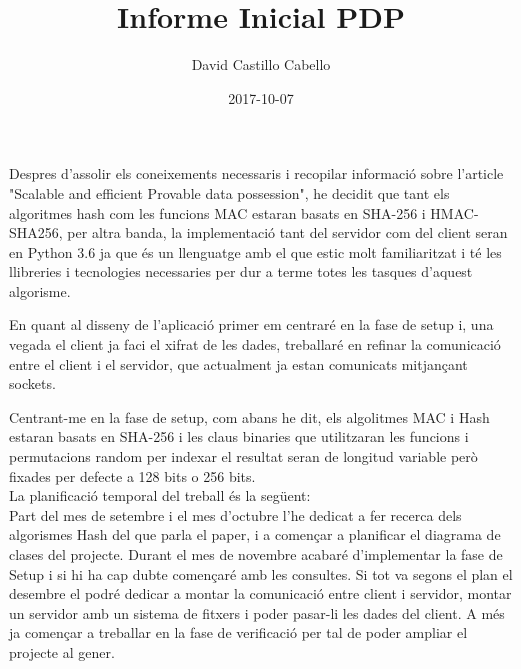 \documentclass{article}
\title{Informe Inicial PDP}
\date{2017-10-07}
\author{David Castillo Cabello}
\begin{document}
	\maketitle
	\newpage
	
Despres d'assolir els coneixements necessaris i recopilar informació sobre l'article "Scalable and efficient Provable data possession", he decidit que tant els algoritmes hash com les funcions MAC estaran basats en SHA-256 i HMAC-SHA256, per altra banda, la implementació tant del servidor com del client seran en Python 3.6 ja que és un llenguatge amb el que estic molt familiaritzat i té les llibreries i tecnologies necessaries per dur a terme totes les tasques d'aquest algorisme.

En quant al disseny de l'aplicació primer em centraré en la fase de setup i, una vegada el client ja faci el xifrat de les dades, treballaré en refinar la comunicació entre el client i el servidor, que actualment ja estan comunicats mitjançant sockets. 

Centrant-me en la fase de setup, com abans he dit, els algolitmes MAC i Hash estaran basats en SHA-256  i les claus binaries que utilitzaran les funcions i permutacions random per indexar el resultat seran de longitud variable però fixades per defecte a 128 bits o 256 bits.\\

La planificació temporal del treball és la següent:\\
Part del mes de setembre i el mes d'octubre l'he dedicat a fer recerca dels algorismes Hash del que parla el paper, i a començar a planificar el diagrama de clases del projecte. 
Durant el mes de novembre acabaré d'implementar la fase de Setup i si hi ha cap dubte començaré amb les consultes. 
Si tot va segons el plan el desembre el podré dedicar a montar la comunicació entre client i servidor, montar un servidor amb un sistema de fitxers i poder pasar-li les dades del client. A més ja començar a treballar en la fase de verificació per tal de poder ampliar el projecte al gener. 

      
\end{document}
